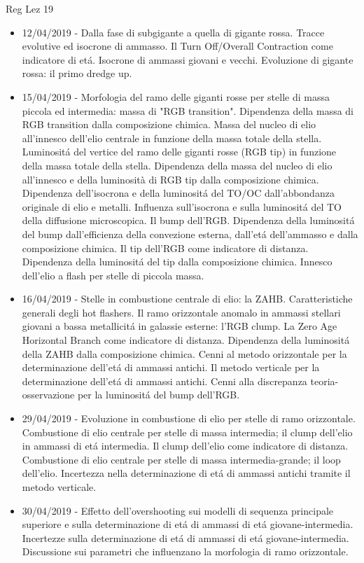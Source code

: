 \begin{frame}[allowframebreaks]{Reg Lez 19}
\begin{itemize}
\item 12/04/2019 - Dalla fase di subgigante a quella di gigante rossa. Tracce evolutive ed isocrone di ammasso. Il Turn Off/Overall Contraction come indicatore di et\'a. Isocrone di ammassi giovani e vecchi. Evoluzione di gigante rossa: il primo dredge up.
\item 15/04/2019 - Morfologia del ramo delle giganti rosse per stelle di massa piccola ed intermedia: massa di "RGB transition". Dipendenza della massa di RGB transition dalla composizione chimica. Massa del nucleo di elio all'innesco dell'elio centrale in funzione della massa totale della stella. Luminosit\'a del vertice del ramo delle giganti rosse (RGB tip) in funzione della massa totale della stella. Dipendenza della massa del nucleo di elio all'innesco e della luminosità di RGB tip dalla composizione chimica. Dipendenza dell'isocrona e della luminosit\'a del TO/OC dall'abbondanza originale di elio e metalli. Influenza sull'isocrona e sulla luminosit\'a del TO della diffusione microscopica. Il bump dell'RGB. Dipendenza della luminosit\'a del bump dall'efficienza della convezione esterna, dall'et\'a dell'ammasso e dalla composizione chimica. Il tip dell'RGB come indicatore di distanza. Dipendenza della luminosit\'a del tip dalla composizione chimica. Innesco dell'elio a flash per stelle di piccola massa.
\item 16/04/2019 - Stelle in combustione centrale di elio: la ZAHB. Caratteristiche generali degli hot flashers. Il ramo orizzontale anomalo in ammassi stellari giovani a bassa metallicit\'a in galassie esterne: l'RGB clump. La Zero Age Horizontal Branch come indicatore di distanza. Dipendenza della luminosit\'a della ZAHB dalla composizione chimica. Cenni al metodo orizzontale per la determinazione dell'et\'a di ammassi antichi. Il metodo verticale per la determinazione dell'et\'a di ammassi antichi. Cenni alla discrepanza teoria-osservazione per la luminosit\'a del bump dell'RGB.
\item 29/04/2019 - Evoluzione in combustione di elio per stelle di ramo orizzontale. Combustione di elio centrale per stelle di massa intermedia; il clump dell'elio in ammassi di et\'a intermedia. Il clump dell'elio come indicatore di distanza. Combustione di elio centrale per stelle di massa intermedia-grande; il loop dell'elio. Incertezza nella determinazione di et\'a di ammassi antichi tramite il metodo verticale.
\item 30/04/2019 - Effetto dell'overshooting sui modelli di sequenza principale superiore e sulla determinazione di et\'a di ammassi di et\'a giovane-intermedia. Incertezze sulla determinazione di et\'a di ammassi di et\'a giovane-intermedia. Discussione sui parametri che influenzano la morfologia di ramo orizzontale.

\end{itemize}
\end{frame}
